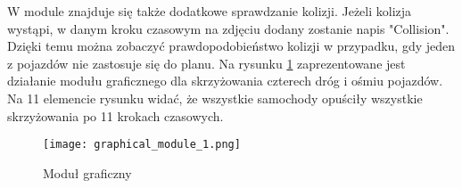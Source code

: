 \newline
\newline
W module znajduje się także dodatkowe sprawdzanie kolizji. Jeżeli kolizja wystąpi, w danym kroku czasowym na zdjęciu dodany zostanie napis "Collision". Dzięki temu można zobaczyć prawdopodobieństwo kolizji w przypadku, gdy jeden z pojazdów nie zastosuje się do planu.
\newline
\newline
Na rysunku \ref{graphical-framework} zaprezentowane jest działanie modułu graficznego dla skrzyżowania czterech dróg i ośmiu pojazdów. Na 11 elemencie rysunku widać, że wszystkie samochody opuściły wszystkie skrzyżowania po 11 krokach czasowych.
\begin{figure}
    \texttt{[image: graphical\_module\_1.png]}
  \caption{Moduł graficzny}
  \label{graphical-framework}
\end{figure}
\newpage
